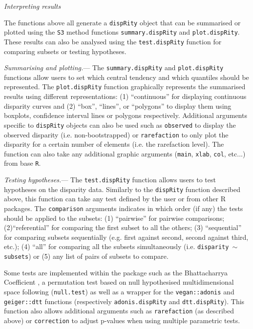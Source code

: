 \documentclass[12pt,letterpaper]{article}
\renewcommand{\subsection}[1]{%
\bigskip
\begin{center}
\begin{large}
\normalfont\itshape #1
\end{large}
\end{center}}
\renewcommand{\subsubsection}[1]{%
\vspace{2ex}
\noindent
\textit{#1.}---}
\newcommand{\disp}{\texttt{dispRity} }
\begin{document}
\subsection{Interpreting results}
The functions above all generate a \disp object that can be summarised or plotted using the \texttt{S3} method functions \texttt{summary.dispRity} and \texttt{plot.dispRity}.
These results can also be analysed using the \texttt{test.dispRity} function for comparing subsets or testing hypotheses.

\subsubsection{Summarising and plotting}
The \texttt{summary.dispRity} and \texttt{plot.dispRity} functions allow users to set which central tendency and which quantiles should be represented.
The \texttt{plot.dispRity} function graphically represents the summarised results using different representations: (1) ``continuous'' for displaying continuous disparity curves and (2) ``box'', ``lines'', or ``polygons'' to display them using boxplots, confidence interval lines or polygons respectively.
Additional arguments specific to \disp objects can also be used such as \texttt{observed} to display the observed disparity (i.e. non-bootstrapped) or \texttt{rarefaction} to only plot the disparity for a certain number of elements (i.e. the rarefaction level).
The function can also take any additional graphic arguments (\texttt{main}, \texttt{xlab}, \texttt{col}, etc...) from base \texttt{R}.

\subsubsection{Testing hypotheses}
The \texttt{test.dispRity} function allows users to test hypotheses on the disparity data.
Similarly to the \disp function described above, this function can take any test defined by the user or from other R packages.
The \texttt{comparison} arguments indicates in which order (if any) the tests should be applied to the subsets: (1) ``pairwise'' for pairwise comparisons; (2)``referential'' for comparing the first subset to all the others; (3) ``sequential'' for comparing subsets sequentially (e.g. first against second, second against third, etc.); (4) ``all'' for comparing all the subsets simultaneously (i.e. \texttt{disparity $\mathtt{\sim}$ subsets}) or (5) any list of pairs of subsets to compare.

Some tests are implemented within the package such as the Bhattacharrya Coefficient \citep[\texttt{bhatt.coeff};][]{Bhattacharyya,GuillermeCooper}, a permutation test based on null hypothesised multidimensional space following \cite{ManlyPermutations,diaz2016global} (\texttt{null.test}) 
as well as a wrapper for the \texttt{vegan::adonis} \citep{oksanen2007vegan} and \texttt{geiger::dtt} \citep{geiger2008} functions (respectively \texttt{adonis.dispRity} and \texttt{dtt.dispRity}).
This function also allows additional arguments such as \texttt{rarefaction} (as described above) or \texttt{correction} to adjust p-values when using multiple parametric tests.
\end{document}

